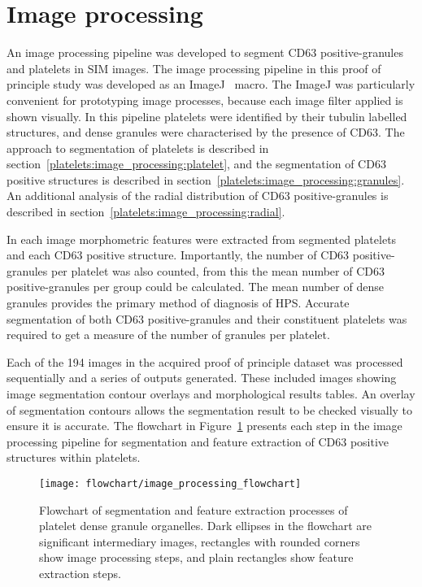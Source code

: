 \section{Image processing}
\label{platelets:image_processing}
An image processing pipeline was developed to segment CD63 positive-granules and platelets in SIM images. The image processing pipeline in this proof of principle study was developed as an ImageJ~\cite{Schneider2012} macro. The ImageJ was particularly convenient for prototyping image processes, because each image filter applied is shown visually. In this pipeline platelets were identified by their tubulin labelled structures, and dense granules were characterised by the presence of CD63. The approach to segmentation of platelets is described in section~\ref{platelets:image_processing:platelet}, and the segmentation of CD63 positive structures is described in section~\ref{platelets:image_processing:granules}. An additional analysis of the radial distribution of CD63 positive-granules is described in section~\ref{platelets:image_processing:radial}.

In each image morphometric features were extracted from segmented platelets and each CD63 positive structure. Importantly, the number of CD63 positive-granules per platelet was also counted, from this the mean number of CD63 positive-granules per group could be calculated. The mean number of dense granules provides the primary method of diagnosis of HPS. Accurate segmentation of both CD63 positive-granules and their constituent platelets was required to get a measure of the number of granules per platelet.

Each of the 194 images in the acquired proof of principle dataset was processed sequentially and a series of outputs generated. These included images showing image segmentation contour overlays and morphological results tables. An overlay of segmentation contours allows the segmentation result to be checked visually to ensure it is accurate. The flowchart in Figure~\ref{figure:platelets:image_processing:flowchart} presents each step in the image processing pipeline for segmentation and feature extraction of CD63 positive structures within platelets.

\begin{figure}[htbp]
	\centering
	\texttt{[image: flowchart/image\_processing\_flowchart]}
	\caption[Flowchart of segmentation processes of endothelial platelets]{Flowchart of segmentation and feature extraction processes of platelet dense granule organelles. Dark ellipses in the flowchart are significant intermediary images, rectangles with rounded corners show image processing steps, and plain rectangles show feature extraction steps.}
	\label{figure:platelets:image_processing:flowchart}
\end{figure}

